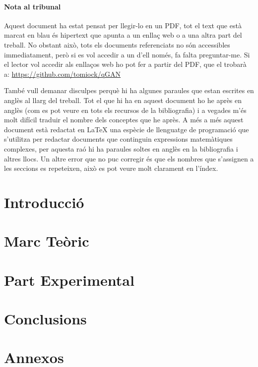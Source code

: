 \documentclass[a4paper,12pt,arial,numbered,print,index,oneside]{book}
\newcommand\blankpage{%
	\null
	\thispagestyle{empty}%
	\addtocounter{page}{-1}%
	\newpage}
\begin{document}
	\thispagestyle{plain}
	
	\subsection*{Nota al tribunal}
	Aquest document ha estat pensat per llegir-lo en un PDF, tot el text que està marcat en blau és hipertext que apunta a un enllaç web o a una altra part del treball. No obstant això, tots els documents referenciats no són accessibles immediatament, però si es vol accedir a un d'ell només, fa falta preguntar-me. Si el lector vol accedir als enllaços web ho pot fer a partir del PDF, que el trobarà a: \href{https://github.com/tomiock/qGAN}{https://github.com/tomiock/qGAN}	
	
	També vull demanar disculpes perquè hi ha algunes paraules que estan escrites en anglès al llarg del treball. Tot el que hi ha en aquest document ho he après en anglès (com es pot veure en tots els recursos de la bibliografia) i a vegades m'és molt difícil traduir el nombre dels conceptes que he après. A més a més aquest document està redactat en \LaTeX{} una espècie de llenguatge de programació que s'utilitza per redactar documents que continguin expressions matemàtiques complexes, per aquesta raó hi ha paraules soltes en anglès en la bibliografia i altres llocs. Un altre error que no puc corregir és que els nombres que s'assignen a les seccions es repeteixen, això es pot veure molt clarament en l'índex.
	
	\afterpage{\blankpage}
	
	\part*{Introducció}
	\label{part:intro}
	
	
	\part{Marc Teòric}
	\label{part:theoretical_framework}
	
	
	\part{Part Experimental}
	\label{part:experimental_work}
	
	
	\part{Conclusions}
	\label{part:conclusions}
	

	\setcounter{chapter}{0}
	\renewcommand{\thechapter}{\Alph{chapter}}
	\part{Annexos}
	\label{part:appendices}
	

	\typeout{}
	
	
	
\end{document}
